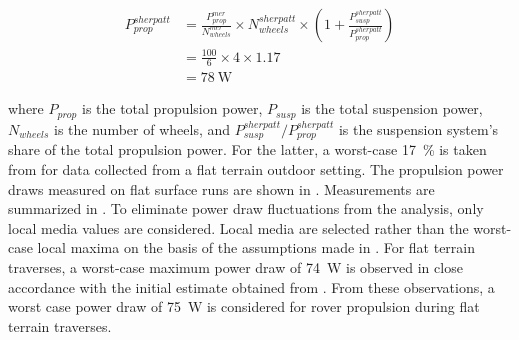 \begin{align}
  \label{eq:InitialPropulsionPowerEstimate}
  P_{prop}^{sherpatt} &= \frac{P_{prop}^{mer}}{N_{wheels}^{mer}} \times N_{wheels}^{sherpatt} \times \left(1 +\frac{P_{susp}^{sherpatt}}{P_{prop}^{sherpatt}}\right) \\
           &= \frac{100}{6} \times 4 \times 1.17\\
           &= \SI{78}{\watt}
\end{align}


where $P_{prop}$ is the total propulsion power, $P_{susp}$ is the total suspension power, $N_{wheels}$ is the number of wheels, and $P_{susp}^{sherpatt} / P_{prop}^{sherpatt}$ is the suspension system's share of the total propulsion power. For the latter, a worst-case \SI{17}{\percent} is taken from  for data collected from a flat terrain outdoor setting. The propulsion power draws measured on flat surface runs are shown in . Measurements are summarized in . To eliminate power draw fluctuations from the analysis, only local media values are considered. Local media are selected rather than the worst-case local maxima on the basis of the assumptions made in . For flat terrain traverses, a worst-case maximum power draw of \SI{74}{\watt} is observed in close accordance with the initial estimate obtained from . From these observations, a worst case power draw of \SI{75}{\watt} is considered for rover propulsion during flat terrain traverses.



